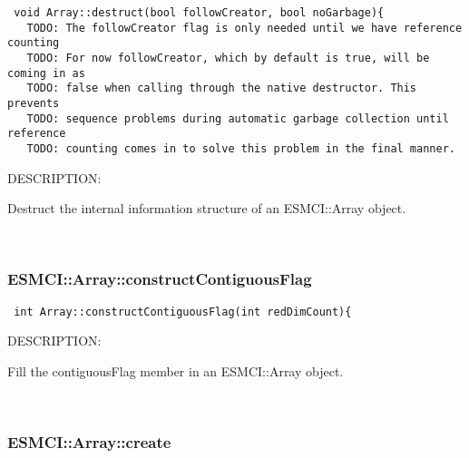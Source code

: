   
\begin{verbatim} void Array::destruct(bool followCreator, bool noGarbage){
   TODO: The followCreator flag is only needed until we have reference counting
   TODO: For now followCreator, which by default is true, will be coming in as
   TODO: false when calling through the native destructor. This prevents
   TODO: sequence problems during automatic garbage collection until reference
   TODO: counting comes in to solve this problem in the final manner.\end{verbatim}
{\sf DESCRIPTION:\\ }


      Destruct the internal information structure of an ESMCI::Array object.
   
 
\mbox{}\hrulefill\
 
\subsubsection [ESMCI::Array::constructContiguousFlag] {ESMCI::Array::constructContiguousFlag}


  
\begin{verbatim} int Array::constructContiguousFlag(int redDimCount){\end{verbatim}
{\sf DESCRIPTION:\\ }


      Fill the contiguousFlag member in an ESMCI::Array object.
   
 
\mbox{}\hrulefill\
 
\subsubsection [ESMCI::Array::create] {ESMCI::Array::create}


